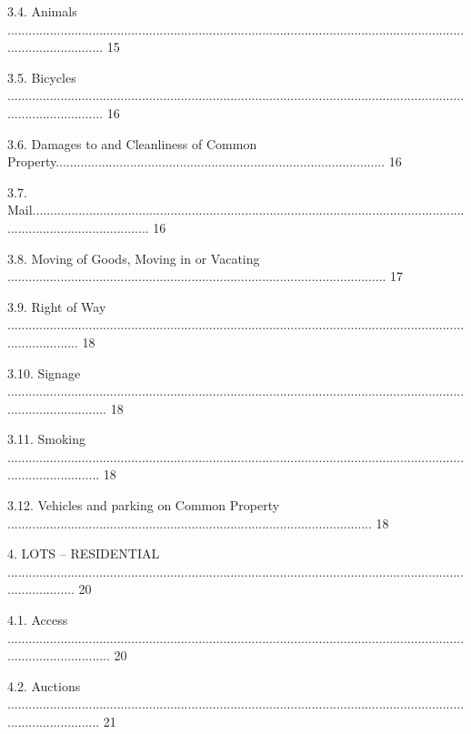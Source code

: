 \documentclass{article}
\begin{document}
{\fontsize{9.99}{1}3.4. Animals ............................................................................................................................................................ 15 }

{\fontsize{9.99}{1}3.5. Bicycles ............................................................................................................................................................ 16 }

{\fontsize{9.99}{1}3.6. Damages to and Cleanliness of Common Property............................................................................................. 16 }

{\fontsize{9.99}{1}3.7. Mail.................................................................................................................................................................. 16 }

{\fontsize{9.99}{1}3.8. Moving of Goods, Moving in or Vacating ........................................................................................................... 17 }

{\fontsize{9.99}{1}3.9. Right of Way ..................................................................................................................................................... 18 }

{\fontsize{9.99}{1}3.10. Signage ............................................................................................................................................................. 18 }

{\fontsize{9.99}{1}3.11. Smoking ........................................................................................................................................................... 18 }

{\fontsize{9.99}{1}3.12. Vehicles and parking on Common Property ....................................................................................................... 18 }

{\fontsize{9.99}{1}4. LOTS – RESIDENTIAL .................................................................................................................................................... 20 }

{\fontsize{9.99}{1}4.1. Access .............................................................................................................................................................. 20 }

{\fontsize{9.99}{1}4.2. Auctions ........................................................................................................................................................... 21 }
\end{document}
